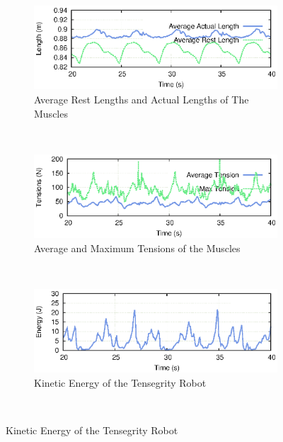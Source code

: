 \documentclass[twocolumn,10pt]{asme2ej}
\begin{document}
\begin{figure}
        \centering
        \begin{subfigure}[b]{0.9\columnwidth}
                \includegraphics[width=\textwidth]{results/tension-energy/lengths.eps}
                \caption{Average Rest Lengths and Actual Lengths of The Muscles}
				\label{fig:lengths}
        \end{subfigure}\\
        \begin{subfigure}[b]{0.9\columnwidth}
				\includegraphics[width=\textwidth]{results/tension-energy/tensions.eps}
                \caption{Average and Maximum Tensions of the Muscles}
				\label{fig:tensions}
        \end{subfigure}\\
        \begin{subfigure}[b]{0.9\columnwidth}
                \includegraphics[width=\textwidth]{results/tension-energy/tensKinEnergy.eps}
                \caption{Kinetic Energy of the Tensegrity Robot}
                \label{fig:KinEnergy}
        \end{subfigure}\\

\end{figure}
\end{document}
